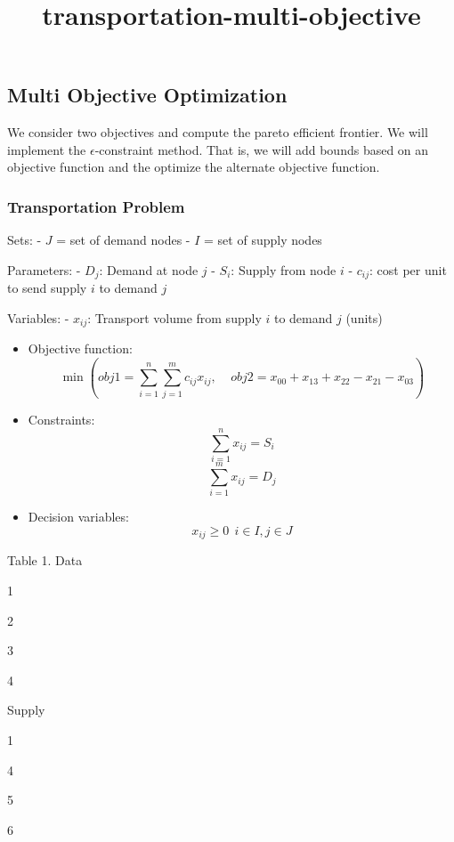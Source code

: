 \documentclass[11pt]{article}
\title{transportation-multi-objective}
\providecommand{\tightlist}{%
      \setlength{\itemsep}{0pt}\setlength{\parskip}{0pt}}
\begin{document}
    
    \maketitle
    
    

    
    \hypertarget{multi-objective-optimization}{%
\subsection{Multi Objective
Optimization}\label{multi-objective-optimization}}

We consider two objectives and compute the pareto efficient frontier. We
will implement the \(\epsilon\)-constraint method. That is, we will add
bounds based on an objective function and the optimize the alternate
objective function.

\hypertarget{transportation-problem}{%
\subsubsection{Transportation Problem}\label{transportation-problem}}

Sets: - \(J\) = set of demand nodes - \(I\) = set of supply nodes

Parameters: - \(D_j\): Demand at node \(j\) - \(S_i\): Supply from node
\(i\) - \(c_{ij}\): cost per unit to send supply \(i\) to demand \(j\)

Variables: - \(x_{ij}\): Transport volume from supply \(i\) to demand
\(j\) (units)

\begin{itemize}
\tightlist
\item
  Objective function:
  \[\min \left( obj1 = \sum_{i=1}^n\sum_{j=1}^mc_{ij}x_{ij}, \ \ \ \ \    obj2 =  x_{00} + x_{13} + x_{22} - x_{21} - x_{03}\right)\]
\item
  Constraints: \[\sum_{i=1}^nx_{ij}=S_i\] \[\sum_{i=1}^mx_{ij}=D_j\]
\item
  Decision variables: \[x_{ij} \geq 0 \ \ i \in I, j \in J\]
\end{itemize}

Table 1. Data

1

2

3

4

Supply

1

4

5

6
\end{document}
